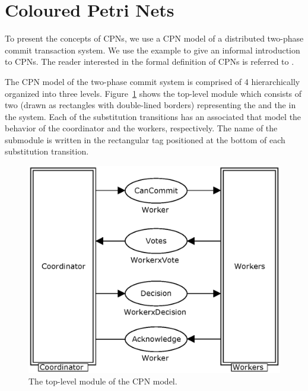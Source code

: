 \section{Coloured Petri Nets}
\label{sect:language}

To present the concepts of CPNs, we use a CPN model of a distributed
two-phase commit transaction system. We use the example to give an
informal introduction to CPNs. The reader interested in the formal
definition of CPNs is referred to \cite{newcpnbook}.


The CPN model of the two-phase commit system is comprised of 4
 hierarchically organized into three
levels. Figure~\ref{fig:commit} shows the top-level module which
consists of two  (drawn as
rectangles with double-lined borders) representing the
 and the  in the system. Each of
the substitution transitions has an associated  that
model the behavior of the coordinator and the workers,
respectively. The name of the submodule is written in the rectangular
tag positioned at the bottom of each substitution transition.

\begin{figure}[b]
\centering
\includegraphics[scale=.52]{figures/Commit.eps}
\caption{The top-level module of the CPN model.}
\label{fig:commit}
\end{figure}


